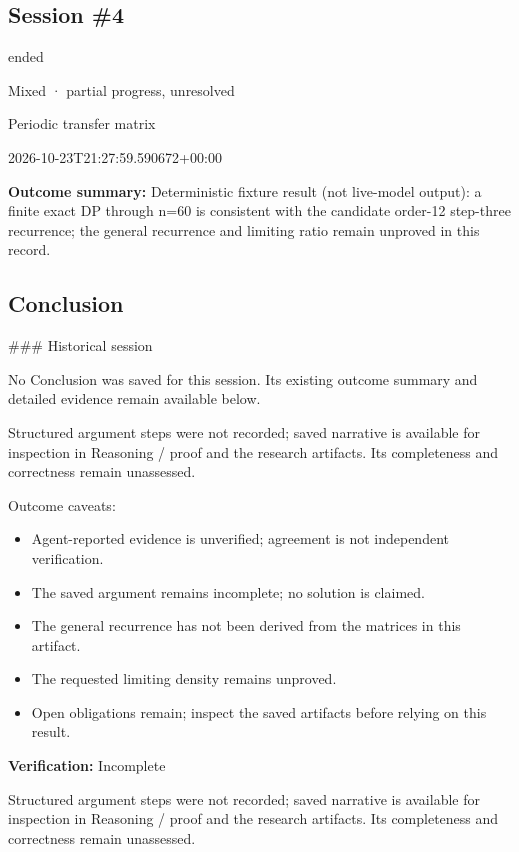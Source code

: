 \documentclass[11pt]{article}
\begin{document}
\subsection{Session \#4}
\begin{description}[style=nextline,font=\normalfont\bfseries,leftmargin=0pt,labelsep=0pt]
\item[Execution status] ended
\item[Outcome] Mixed · partial progress, unresolved
\item[Strategy] Periodic transfer matrix
\item[Started] 2026-10-23T21:27:59.590672+00:00
\end{description}
\textbf{Outcome summary:} Deterministic fixture result (not live-model output): a finite exact DP through n=60 is consistent with the candidate order-12 step-three recurrence; the general recurrence and limiting ratio remain unproved in this record.\par
\subsection{Conclusion}
\#\#\# Historical session

No Conclusion was saved for this session. Its existing outcome summary and detailed evidence remain available below.

Structured argument steps were not recorded; saved narrative is available for inspection in Reasoning / proof and the research artifacts. Its completeness and correctness remain unassessed.\par
Outcome caveats:\par
\begin{itemize}
\item Agent-reported evidence is unverified; agreement is not independent verification.
\item The saved argument remains incomplete; no solution is claimed.
\item The general recurrence has not been derived from the matrices in this artifact.
\item The requested limiting density remains unproved.
\item Open obligations remain; inspect the saved artifacts before relying on this result.
\end{itemize}
\textbf{Verification:} Incomplete\par
Structured argument steps were not recorded; saved narrative is available for inspection in Reasoning / proof and the research artifacts. Its completeness and correctness remain unassessed.\par
\end{document}

